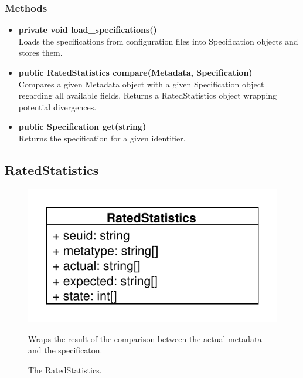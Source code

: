 \subsubsection{Methods}
\begin{itemize}
	\item \textbf{private void load\_specifications()}\\
	Loads the specifications from configuration files into Specification objects and stores them.
	\item \textbf{public RatedStatistics compare(Metadata, Specification)}\\
	Compares a given Metadata object with a given Specification object regarding all available fields. Returns a RatedStatistics object wrapping potential divergences.
	\item \textbf{public Specification get(string)}\\
	Returns the specification for a given identifier.
\end{itemize}


\subsection{RatedStatistics}
\begin{figure}[htbp]
	\begin{minipage}[t]{7cm}
		\vspace{0pt}
		\centering
		\includegraphics[scale=0.6]{./diagram_pictures/RatedStatistics.pdf}
		\caption{The RatedStatistics.}
	\end{minipage}
	\hfill
	\begin{minipage}[t]{8cm}
		\vspace{10pt}
		Wraps the result of the comparison between the actual metadata and the specificaton.
	\end{minipage}
\end{figure}

